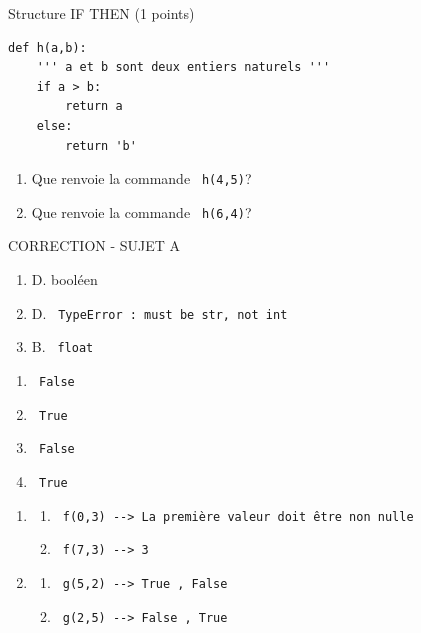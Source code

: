 \documentclass[a4paper,12pt,openany]{book}
\begin{document}
\bigskip

\exo \qquad Structure IF THEN\hfill
(1 points)

\begin{lstlisting}
def h(a,b):
	''' a et b sont deux entiers naturels '''
	if a > b:
		return a
	else:
		return 'b'

\end{lstlisting}

\begin{enumerate}
	\item Que renvoie la commande \verb+ h(4,5)+? \dotfill
	\item Que renvoie la commande \verb+ h(6,4)+? \dotfill

\end{enumerate}


  
  \newpage
  
  
  \begin{center}
  {\LARGE CORRECTION - SUJET A}
  \end{center}
  
\setcounter{nexo}{0}
  
  \exo
  
  \begin{enumerate}
  	\item D. booléen
  	\item D. \verb+ TypeError : must be str, not int+
  	\item B. \verb+ float +
  \end{enumerate}
  
  \medskip
  
  \exo 
  
  \begin{enumerate}
  	\item \verb+ False +
  	\item \verb+ True +
  	\item \verb+ False +
  	\item \verb+ True +
  \end{enumerate}
  
  \medskip
  
  \exo
  
  \begin{enumerate}
  \item 
  	\begin{enumerate}
  	\item \verb+ f(0,3) --> La première valeur doit être non nulle+
  	\item \verb+ f(7,3) --> 3+
  \end{enumerate}
  
  \medskip
  
  \item 
  
  \begin{enumerate}
  	\item \verb+ g(5,2) --> True , False +
  	\item \verb+ g(2,5) --> False , True+
  \end{enumerate}
  \end{enumerate}
  
\end{document}
